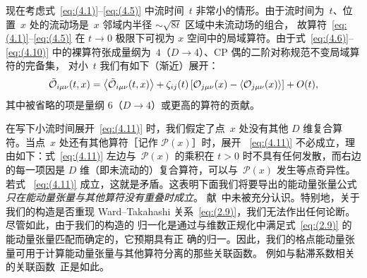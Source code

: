 现在考虑式~\eqref{eq:(4.1)}--\eqref{eq:(4.5)} 中流时间~$t$
非常小的情形。由于流时间为~$t$、位置~$x$ 处的流动场是~$x$ 邻域内半径%
$\sim\sqrt{8t}$ 区域中未流动场的组合，%
故算符~\eqref{eq:(4.1)}--\eqref{eq:(4.5)} 在 $t\to0$
极限下可视为 $x$ 空间中的局域算符。由于式~\eqref{eq:(4.6)}--\eqref{eq:(4.10)}
中的裸算符张成量纲为~$4$（$D\to4$）、CP 偶的二阶对称规范不变局域算符的完备集，
对小~$t$ 我们有如下（渐近）展开：
\begin{equation}
   \Tilde{\mathcal{O}}_{i\mu\nu}(t,x)
   =\left\langle\Tilde{\mathcal{O}}_{i\mu\nu}(t,x)\right\rangle
   +\zeta_{ij}(t)
   \left[\mathcal{O}_{j\mu\nu}(x)
   -\left\langle\mathcal{O}_{j\mu\nu}(x)\right\rangle\right]+O(t),
\label{eq:(4.11)}
\end{equation}
其中被省略的项是量纲 $6$（$D\to4$）或更高的算符的贡献。

在写下小流时间展开~\eqref{eq:(4.11)} 时，我们假定了点~$x$ 处没有其他 $D$
维复合算符。当点~$x$ 处还有其他算符［记作 $\mathcal{P}(x)$］时，展开%
~\eqref{eq:(4.11)} 不必成立，理由如下：式~\eqref{eq:(4.11)}
左边与~$\mathcal{P}(x)$ 的乘积在 $t>0$ 时不具有任何发散，而右边的每一项因是 $D$
维（即未流动的）复合算符，可以与~$\mathcal{P}(x)$ 发生等点奇异性。若式%
~\eqref{eq:(4.11)} 成立，这就是矛盾。这表明下面我们将要导出的能动量张量公式
\emph{只在能动量张量与其他算符没有重叠时成立}。%
献~\cite{Suzuki:2013gza}中未被充分认识。特别地，关于我们的构造是否重现
Ward--Takahashi 关系~\eqref{eq:(2.9)}，我们无法作出任何论断。尽管如此，由于我们的构造的
归一化是通过与维数正规化中满足式~\eqref{eq:(2.9)} 的能动量张量匹配而确定的，它预期具有正
确的归一。因此，我们的格点能动量张量可用于计算能动量张量与其他算符分离的那些关联函数。
例如与黏滞系数相关的关联函数~\cite{Nakamura:2004sy,Meyer:2007ic,Meyer:2007dy}正是如此。

